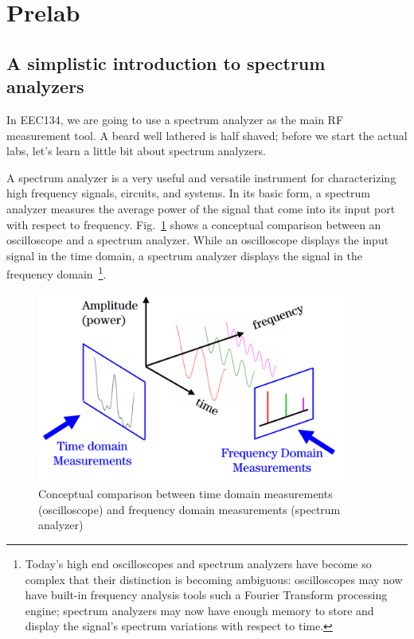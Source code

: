 \documentclass[letterpaper, 11pt]{article}
\begin{document}
\newpage
\section{Prelab}

\subsection{A simplistic introduction to spectrum analyzers}
In EEC134, we are going to use a spectrum analyzer as the main RF measurement tool. A beard well lathered is half shaved; before we start the actual labs, let's learn a little bit about spectrum analyzers.

A spectrum analyzer is a very useful and versatile instrument for characterizing high frequency signals, circuits, and systems. In its basic form, a spectrum analyzer measures the average power of the signal that come into its input port with respect to frequency. Fig.~\ref{fig:amp-time-frequency} shows a conceptual comparison between an oscilloscope and a spectrum analyzer. While an oscilloscope displays the input signal in the time domain, a spectrum analyzer displays the signal in the frequency domain~\footnote{Today’s high end oscilloscopes and spectrum analyzers have become so complex that their distinction is becoming ambiguous: oscilloscopes may now have built-in frequency analysis tools such a Fourier Transform processing engine; spectrum analyzers may now have enough memory to store and display the signal’s spectrum variations with respect to time.}. 

\begin{figure}[h]
	\centering
	\includegraphics[width=4in]{amp-time-frequency}
	\caption{Conceptual comparison between time domain measurements (oscilloscope) and frequency domain measurements (spectrum analyzer)~\cite{thomas-sa}}
	\label{fig:amp-time-frequency}
\end{figure}
\end{document}
